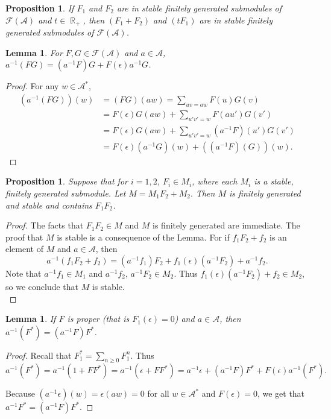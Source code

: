 \documentclass{kepart2010}
\theoremstyle{plain}
\newtheorem{lem}[thm]{Lemma}
\newtheorem{prop}[thm]{Proposition}
\theoremstyle{definition}
\theoremstyle{remark}
\theoremstyle{definition}
\numberwithin{equation}{section}
\begin{document}
\begin{prop}
If $F_{1}$ and $F_{2}$ are in stable finitely generated submodules
of $\mathcal{F}({{\mathcal A}})$ and $t \in \operatorname{\mathbb R}_{+}$, then $(F_{1}+F_{2})$ and
$(tF_{1})$ are in stable finitely generated submodules
of $\mathcal{F}({{\mathcal A}})$.
\end{prop}
\begin{lem}
 For $F,G \in {\mathcal F ({{\mathcal A}})}$ and $a \in {{\mathcal A}}$, $a^{-1}(FG) =
(a^{-1}F)G+F(\epsilon)a^{-1}G$.
    \end{lem}
\begin{proof} For any $w \in {{\mathcal A}}^{*}$,
\begin{equation}
\begin{split}
(a^{-1}(FG))(w) &= (FG)(aw)=\sum_{uv=aw}F(u)G(v)\\
    &=F(\epsilon)G(aw)+ \sum_{u'v'=w}F(au')G(v')\\
    &=F(\epsilon)G(aw)+\sum_{u'v'=w}(a^{-1}F)(u')G(v')\\
    &=F(\epsilon)(a^{-1}G)(w)+((a^{-1}F)(G))(w).
\end{split}
\end{equation}
\end{proof}
\begin{prop}
Suppose that for $i=1,2$, $F_{i}\in M_{i}$, where each $M_{i}$ is a
stable, finitely generated submodule. Let $M= M_{1}F_{2}+M_{2}.$
Then $M$ is finitely generated and stable
{and contains $F_1F_2$.}
\end{prop}
\begin{proof} {
The facts that $F_1F_2 \in M$ and $M$ is finitely generated are}
immediate. The proof that $M$ is stable is a consequence of the
Lemma. For if $f_1F_2+f_2$ is an element of $M$ and $a \in {{\mathcal A}}$,
then \begin{equation}
a^{-1}(f_{1}F_{2}+f_2)=(a^{-1}f_{1})F_{2}+f_{1}(\epsilon)(a^{-1}F_{2})+a^{-1}f_2.
\end{equation} Note that $a^{-1}f_{1}\in M_{1}$ and $a^{-1}f_{2}$, $a^{-1}F_{2}
\in M_{2}$.  Thus $f_{1}(\epsilon)(a^{-1}F_{2})+f_2 \in M_{2}$, so
we conclude that
$M$ is stable.\\
\end{proof}
\begin{lem}
If $F$ is proper (that is $F_{1}(\epsilon) = 0$) and $a \in {{\mathcal A}}$,
then $a^{-1}(F^{*}) = (a^{-1}F)F^{*}$.
\end{lem}
\begin{proof}
 Recall that $F_{1}^{*}=\sum_{n \geq 0}F_{1}^{n}$. Thus
 $a^{-1}(F^{*}) = a^{-1}(1+FF^{*}) =
a^{-1}(\epsilon+FF^{*}) = a^{-1}\epsilon +
(a^{-1}F)F^{*}+F(\epsilon)a^{-1}(F^{*}).$

Because $(a^{-1} \epsilon)(w) = \epsilon(aw) =0$ for all $w \in
{{\mathcal A}}^{*}$ and $F(\epsilon)=0$, we get that $a^{-1}F^{*} =
(a^{-1}F)F^{*}$.
\end{proof}
\end{document}

